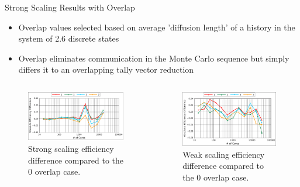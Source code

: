 \documentclass{beamer}
\begin{document}
\begin{frame}{Strong Scaling Results with Overlap}

  \begin{itemize}
  \item Overlap values selected based on average 'diffusion length'
    of a history in the system of 2.6 discrete states
    \bigskip
  \item Overlap eliminates communication in the Monte Carlo sequence
    but simply differs it to an overlapping tally vector reduction
  \end{itemize}

  \begin{columns}
    \begin{column}{0.5\textwidth}

      \begin{figure}[htpb!]
        \begin{center}
          \includegraphics[width=2.4in]{titan_strong_overlap_diff.pdf}
        \end{center}
        \caption{Strong scaling efficiency difference compared to the
          0 overlap case.}
      \end{figure}

    \end{column}

    \begin{column}{0.5\textwidth}

      \begin{figure}[htpb!]
        \begin{center}
          \includegraphics[width=2.4in]{titan_weak_overlap_diff.pdf}
        \end{center}
        \caption{Weak scaling efficiency difference compared to the 0
          overlap case.}
      \end{figure}

    \end{column}
  \end{columns}

\end{frame}
\end{document}
